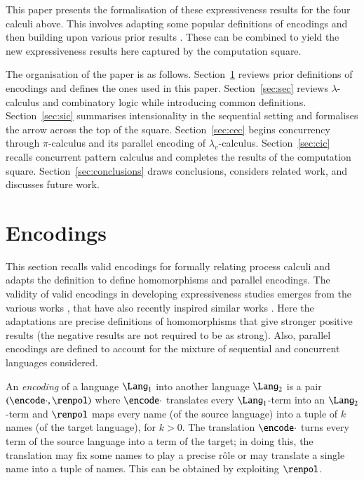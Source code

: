 \documentclass{llncs}
\newcommand{\withrw}[1]{#1}
\begin{document}
This paper presents the formalisation of these expressiveness results for the four calculi above.
This involves adapting some popular definitions of encodings \cite{G:IC08,G:DC10,G:CONCUR08}
and then building upon various prior results
\cite{Curry58combinatorylogic,90426,milner.parrow.ea:calculus-mobile,GivenWilsonGorlaJay10,JayGW11,GivenWilsonPHD}.
These can be combined to yield the new expressiveness results here captured by the
computation square.

The organisation of the paper is as follows.
Section~\ref{sec:encoding} reviews prior definitions of encodings and defines the ones used in this paper.
Section~\ref{sec:sec} reviews $\lambda$-calculus and combinatory logic while introducing common definitions.
Section~\ref{sec:sic} summarises intensionality in the sequential setting and formalises the arrow across the top of the square.
Section~\ref{sec:cec} begins concurrency through $\pi$-calculus and its parallel encoding of $\lambda_v$-calculus.
Section~\ref{sec:cic} recalls concurrent pattern calculus and completes the results of the computation square.
Section~\ref{sec:conclusions} draws conclusions, \withrw{considers related work,} and discusses future work.

\section{Encodings}
\label{sec:encoding}

This section recalls valid encodings \cite{G:CONCUR08}
for formally relating process calculi and adapts the definition to define homomorphisms and
parallel encodings.
The validity of valid encodings in developing expressiveness studies emerges from the
various works \cite{G:IC08,G:DC10,G:CONCUR08}, that have also recently inspired similar works
\cite{LPSS10,LVF10,gla12}.
Here the adaptations are precise definitions of homomorphisms that give stronger positive
results (the negative results are not required to be as strong).
Also, parallel encodings are defined to
account for the mixture of sequential and concurrent languages considered.


An {\em encoding} of a language $\Lang_1$ into another language $\Lang_2$ is a pair
$(\encode\cdot,\renpol)$ where $\encode\cdot$ translates every $\Lang_1$-term into
an $\Lang_2$-term and $\renpol$ maps every name (of the source language) into a tuple
of $k$ names (of the target language), for $k > 0$.
The translation $\encode\cdot$ turns every term of the source language into a term of the
target; in doing this, the translation may fix some names to play a precise r\^ole 
or may translate a single name into a tuple of names. This can be obtained
by exploiting $\renpol$.
\end{document}
